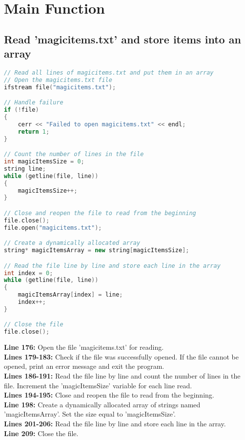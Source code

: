 \documentclass[letterpaper, 10pt,DIV=13]{scrartcl}
\numberwithin{equation}{section} %
\numberwithin{figure}{section} %
\numberwithin{table}{section} %
\begin{document}

\pagebreak

\section{Main Function}
\subsection{Read 'magicitems.txt' and store items into an array}
\begin{linenumbers}
\begin{lstlisting}[language=C++, caption={Store Items in Array}, label={code:example}]
// Read all lines of magicitems.txt and put them in an array
// Open the magicitems.txt file
ifstream file("magicitems.txt");

// Handle failure
if (!file) 
{
    cerr << "Failed to open magicitems.txt" << endl;
    return 1;
}

// Count the number of lines in the file
int magicItemsSize = 0;
string line;
while (getline(file, line)) 
{
    magicItemsSize++;
}

// Close and reopen the file to read from the beginning
file.close();
file.open("magicitems.txt");

// Create a dynamically allocated array
string* magicItemsArray = new string[magicItemsSize];

// Read the file line by line and store each line in the array
int index = 0;
while (getline(file, line)) 
{
    magicItemsArray[index] = line;
    index++;
}

// Close the file
file.close();
\end{lstlisting}
\end{linenumbers}
\nolinenumbers

\textbf{Line 176:} Open the file 'magicitems.txt' for reading. \\
\textbf{Lines 179-183:} Check if the file was successfully opened. If the file cannot be opened, print an error message and exit the program. \\
\textbf{Lines 186-191:} Read the file line by line and count the number of lines in the file. Increment the 'magicItemsSize' variable for each line read. \\
\textbf{Lines 194-195:} Close and reopen the file to read from the beginning. \\
\textbf{Line 198:} Create a dynamically allocated array of strings named 'magicItemsArray'. Set the size equal to 'magicItemsSize'. \\
\textbf{Lines 201-206:} Read the file line by line and store each line in the array. \\
\textbf{Line 209:} Close the file.
\end{document}
